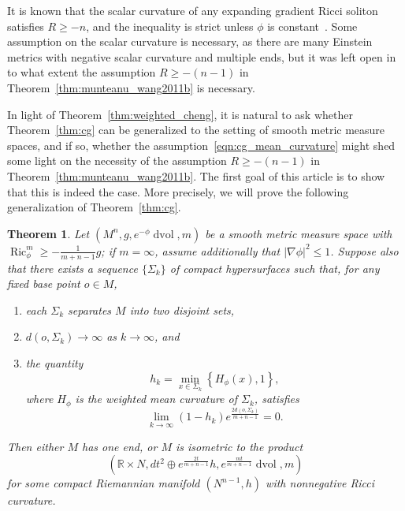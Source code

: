\documentclass{amsart}
\newtheorem{thm}{Theorem}[section]
\theoremstyle{definition}
\theoremstyle{remark}
\numberwithin{equation}{section}
\begin{document}
It is known that the scalar curvature of any expanding gradient Ricci soliton satisfies $R\geq-n$, and the inequality is strict unless $\phi$ is constant~\cite{PigolaRimoldiSetti2011}.  Some assumption on the scalar curvature is necessary, as there are many Einstein metrics with negative scalar curvature and multiple ends, but it was left open in~\cite{MunteanuWang2011b} to what extent the assumption $R\geq-(n-1)$ in Theorem~\ref{thm:munteanu_wang2011b} is necessary.

In light of Theorem~\ref{thm:weighted_cheng}, it is natural to ask whether Theorem~\ref{thm:cg} can be generalized to the setting of smooth metric measure spaces, and if so, whether the assumption~\eqref{eqn:cg_mean_curvature} might shed some light on the necessity of the assumption $R\geq-(n-1)$ in Theorem~\ref{thm:munteanu_wang2011b}.  The first goal of this article is to show that this is indeed the case.  More precisely, we will prove the following generalization of Theorem~\ref{thm:cg}.

\begin{thm}
\label{thm:splitting}
Let $(M^n,g,e^{-\phi}\operatorname{dvol},m)$ be a smooth metric measure space with $\operatorname{Ric}_\phi^m\geq -\frac{1}{m+n-1}g$; if $m=\infty$, assume additionally that ${\lvert}\nabla\phi{\rvert}^2\leq1$.  Suppose also that there exists a sequence $\{\Sigma_k\}$ of compact hypersurfaces such that, for any fixed base point $o\in M$,
\begin{enumerate}
\item each $\Sigma_k$ separates $M$ into two disjoint sets,
\item $d(o,\Sigma_k)\to\infty$ as $k\to\infty$, and
\item the quantity
\[ h_k = \min_{x\in\Sigma_k}\left\{ H_\phi(x), 1\right\}, \]
where $H_\phi$ is the weighted mean curvature of $\Sigma_k$, satisfies
\begin{equation}
\label{eqn:splitting_mean_curvature}
\lim_{k\to\infty} (1-h_k)e^{\frac{2d(o,\Sigma_k)}{m+n-1}} = 0 .
\end{equation}
\end{enumerate}
Then either $M$ has one end, or $M$ is isometric to the product
\begin{equation}
\label{eqn:splitting_conclusion}
\left( {\mathbb{R}}\times N, dt^2\oplus e^{\frac{2t}{m+n-1}}h, e^{\frac{mt}{m+n-1}}\operatorname{dvol}, m \right)
\end{equation}
for some compact Riemannian manifold $(N^{n-1},h)$ with nonnegative Ricci curvature.
\end{thm}
\end{document}
